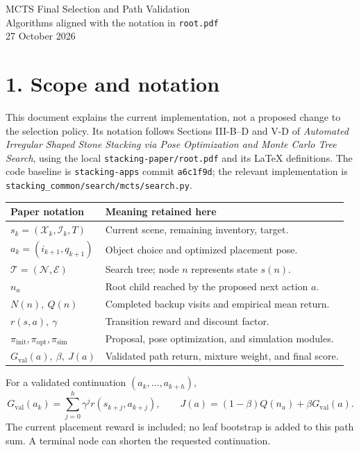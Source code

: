 \documentclass[11pt]{article}
\newcommand{\Gval}{G_{\mathrm{val}}}
\begin{document}
\small
\begin{center}
{\LARGE MCTS Final Selection and Path Validation}\\[6pt]
{\large Algorithms aligned with the notation in \texttt{root.pdf}}\\[5pt]
27 October 2026
\end{center}

\section*{1. Scope and notation}
This document explains the current implementation, not a proposed change to the
selection policy. Its notation follows Sections III-B--D and V-D of
\emph{Automated Irregular Shaped Stone Stacking via Pose Optimization and Monte
Carlo Tree Search}, using the local \texttt{stacking-paper/root.pdf} and its
LaTeX definitions. The code baseline is \texttt{stacking-apps} commit
\texttt{a6c1f9d}; the relevant implementation is
\texttt{stacking\_common/search/mcts/search.py}.

\begin{tabular}{p{.25\linewidth}p{.69\linewidth}}
\hline
Paper notation & Meaning retained here \\
\hline
$s_k=(\mathcal X_k,\mathcal I_k,T)$ & Current scene, remaining inventory, target.\\
$a_k=(i_{k+1},q_{k+1})$ & Object choice and optimized placement pose.\\
$\mathcal T=(\mathcal N,\mathcal E)$ & Search tree; node $n$ represents state $s(n)$.\\
$n_a$ & Root child reached by the proposed next action $a$.\\
$N(n),\ Q(n)$ & Completed backup visits and empirical mean return.\\
$r(s,a),\ \gamma$ & Transition reward and discount factor.\\
$\pi_{\mathrm{init}},\pi_{\mathrm{opt}},\pi_{\mathrm{sim}}$ & Proposal, pose optimization, and simulation modules.\\
$\Gval(a),\ \beta,\ J(a)$ & Validated path return, mixture weight, and final score.\\
\hline
\end{tabular}

For a validated continuation $(a_k,\ldots,a_{k+h})$,
\[
 \Gval(a_k)=\sum_{j=0}^{h}\gamma^j r(s_{k+j},a_{k+j}),
 \qquad J(a)=(1-\beta)Q(n_a)+\beta\Gval(a).
\]
The current placement reward is included; no leaf bootstrap is added to this
path sum. A terminal node can shorten the requested continuation.
\end{document}
